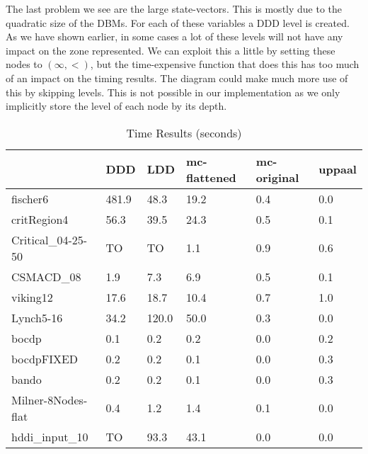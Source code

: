 The last problem we see are the large state-vectors. This is mostly due to the quadratic size of the DBMs. For each of these variables a DDD level is created. As we have shown earlier, in some cases a lot of these levels will not have any impact on the zone represented. We can exploit this a little by setting these nodes to $(\infty,<)$, but the time-expensive function that does this has too much of an impact on the timing results. The diagram could make much more use of this by skipping levels. This is not possible in our implementation as we only implicitly store the level of each node by its depth. 

\begin{table}

    \begin{tabular}{|l|l|l|l|l|l|}
    \hline
                       & DDD   & LDD   & mc-flattened & mc-original & uppaal \\ \hline
    fischer6           & 481.9 & 48.3  & 19.2         & 0.4         & 0.0    \\
    critRegion4        & 56.3  & 39.5  & 24.3         & 0.5         & 0.1    \\
    Critical\_04-25-50 & TO    & TO    & 1.1          & 0.9         & 0.6    \\
    CSMACD\_08         & 1.9   & 7.3   & 6.9          & 0.5         & 0.1    \\
    viking12           & 17.6  & 18.7  & 10.4         & 0.7         & 1.0    \\
    Lynch5-16          & 34.2  & 120.0 & 50.0         & 0.3         & 0.0    \\
    bocdp              & 0.1   & 0.2   & 0.2          & 0.0         & 0.2    \\
    bocdpFIXED         & 0.2   & 0.2   & 0.1          & 0.0         & 0.3    \\
    bando              & 0.2   & 0.2   & 0.1          & 0.0         & 0.3    \\
    Milner-8Nodes-flat & 0.4   & 1.2   & 1.4          & 0.1         & 0.0    \\
    hddi\_input\_10    & TO    & 93.3  & 43.1         & 0.0         & 0.0    \\ \hline
    \end{tabular}
\caption{Time Results (seconds)}
\label{tab:time_results}
\end{table}

